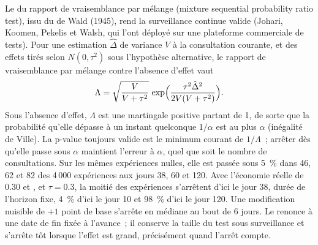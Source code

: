 Le  du rapport de vraisemblance par mélange (mixture sequential probability ratio test), issu du  de Wald (1945), rend la surveillance continue
valide (Johari, Koomen, Pekelis et Walsh, qui l'ont déployé sur une plateforme commerciale de tests). Pour une estimation $\hat\Delta$ de variance $V$ à la consultation courante, et des effets
tirés selon $N(0, \tau^2)$ sous l'hypothèse alternative, le rapport de vraisemblance par mélange contre l'absence d'effet vaut
\[
\Lambda = \sqrt{\frac{V}{V+\tau^2}}\,\exp\Bigl(\frac{\tau^2\hat\Delta^2}{2V(V+\tau^2)}\Bigr).
\]
Sous l'absence d'effet, $\Lambda$ est une martingale positive partant de 1, de sorte que la probabilité qu'elle dépasse à un instant quelconque $1/\alpha$ est au plus $\alpha$ (inégalité
de Ville). La p-value toujours valide est le minimum courant de $1/\Lambda$~; arrêter dès qu'elle passe sous $\alpha$ maintient l'erreur à $\alpha$, quel que soit le nombre
de consultations. Sur les mêmes expériences nulles, elle est passée sous 5~\% dans 46, 62 et 82 des 4\,000 expériences aux jours 38, 60 et 120. Avec l'économie réelle de 0.30 et , et
$\tau = 0.3$, la moitié des expériences s'arrêtent d'ici le jour 38, durée de l'horizon fixe, 4~\% d'ici le jour 10 et 98~\% d'ici le jour 120. Une modification nuisible de $+1$ point de base s'arrête
en médiane au bout de 6 jours. Le  renonce à une date de fin fixée à l'avance~; il conserve la taille du test sous surveillance et s'arrête tôt lorsque l'effet est grand, précisément quand
l'arrêt compte.

